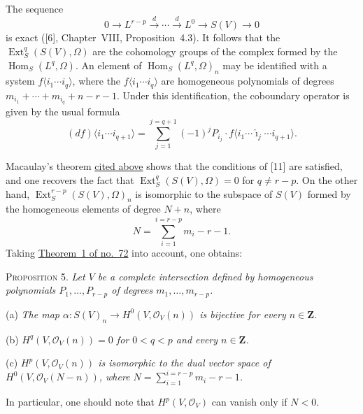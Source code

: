 The sequence
\label{fac:III:5:no:78:formula:resolution}
\[
0\longrightarrow L^{r-p}\overset d\longrightarrow\cdots
\overset d\longrightarrow L^0\longrightarrow S(V)\longrightarrow0
\]
is exact ([6], Chapter~VIII, Proposition~4.3). It follows that the
$\operatorname{Ext}_S^q(S(V),\Omega)$ are the cohomology groups of the
complex formed by the $\operatorname{Hom}_S(L^q,\Omega)$. An element of
$\operatorname{Hom}_S(L^q,\Omega)_n$ may be identified with a system
$f\langle i_1\cdots i_q\rangle$, where the
$f\langle i_1\cdots i_q\rangle$ are homogeneous polynomials of degrees
$m_{i_1}+\cdots+m_{i_q}+n-r-1$. Under this identification, the
coboundary operator is given by the usual formula
\label{fac:III:5:no:78:formula:coboundary}
\[
(df)\langle i_1\cdots i_{q+1}\rangle
=\sum_{j=1}^{j=q+1}(-1)^jP_{i_j}\cdot
f\langle i_1\cdots\widehat{\imath}_j\cdots i_{q+1}\rangle.
\]

Macaulay's theorem \hyperref[fac:III:5:no:78:external-citation:Macaulay-theorem]{cited above} shows that the conditions of [11] are
satisfied, and one recovers the fact that
\label{fac:III:5:no:78:formula:Ext-concentration}
$\operatorname{Ext}_S^q(S(V),\Omega)=0$ for $q\neq r-p$. On the other
hand, $\operatorname{Ext}_S^{r-p}(S(V),\Omega)_n$ is isomorphic to the
subspace of $S(V)$ formed by the homogeneous elements of degree $N+n$,
where
\label{fac:III:5:no:78:def:N}
\[
N=\sum_{i=1}^{i=r-p}m_i-r-1.
\]
Taking \hyperref[fac:III:4:no:72:thm:1]{Theorem~1 of no.~72} into
account, one obtains:

\label{fac:III:5:no:78:prop:5}
\textsc{Proposition 5.} \textit{Let $V$ be a complete intersection
defined by homogeneous polynomials $P_1,\ldots,P_{r-p}$ of degrees
$m_1,\ldots,m_{r-p}$.}

\label{fac:III:5:no:78:prop:5:a}
(a) \textit{The map
$\alpha:S(V)_n\to H^0(V,\mathcal O_V(n))$ is bijective for every
$n\in\mathbf Z$.}

\label{fac:III:5:no:78:prop:5:b}
(b) \textit{$H^q(V,\mathcal O_V(n))=0$ for $0<q<p$ and every
$n\in\mathbf Z$.}

\label{fac:III:5:no:78:prop:5:c}
(c) \textit{$H^p(V,\mathcal O_V(n))$ is isomorphic to the dual vector
space of $H^0(V,\mathcal O_V(N-n))$, where
$N=\sum_{i=1}^{i=r-p}m_i-r-1$.}

\label{fac:III:5:no:78:remark}
In particular, one should note that $H^p(V,\mathcal O_V)$ can vanish
only if $N<0$.
